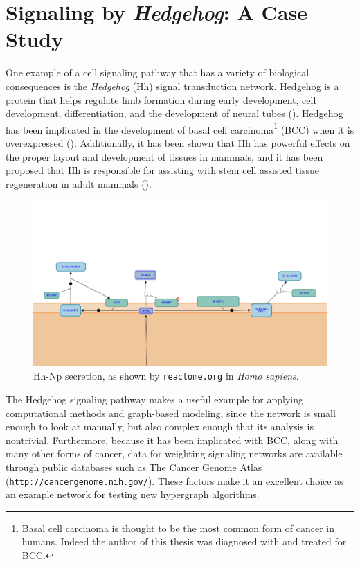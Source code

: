 \documentclass[12pt,twoside]{reedthesis}
\theoremstyle{definition}
\begin{document}
\section{Signaling by \emph{Hedgehog}: A Case Study}

One example of a cell signaling pathway that has a variety of biological consequences is the \textit{Hedgehog} (Hh) signal transduction network. Hedgehog is a protein that helps regulate limb formation during early development, cell development, differentiation, and the development of neural tubes (\cite{Hui2011}). Hedgehog has been implicated in the development of basal cell carcinoma\footnote{Basal cell carcinoma is thought to be the most common form of cancer in humans\cite{paper}. Indeed the author of this thesis was diagnosed with and treated for BCC.} (BCC) when it is overexpressed (\cite{Beachy2004}). Additionally, it has been shown that Hh has powerful effects on the proper layout and development of tissues in mammals, and it has been proposed that Hh is responsible for assisting with stem cell assisted tissue regeneration in adult mammals (\cite{thing}).

\begin{figure}[h]
  \begin{center}
    \includegraphics[width=\textwidth]{Hh-Np_secretion}
  \caption[Hedgehog secretion in \textit{Homo sapiens}]{Hh-Np secretion, as shown by \texttt{reactome.org} in \textit{Homo sapiens}.}
  \label{fig:Hh-Np_secretion}
  \end{center}
\end{figure}

The Hedgehog signaling pathway makes a useful example for applying computational methods and graph-based modeling, since the network is small enough to look at manually, but also complex enough that its analysis is nontrivial. Furthermore, because it has been implicated with BCC, along with many other forms of cancer, data for weighting signaling networks are available through public databases such as The Cancer Genome Atlas (\texttt{http://cancergenome.nih.gov/}). These factors make it an excellent choice as an example network for testing new hypergraph algorithms.\par
\end{document}
